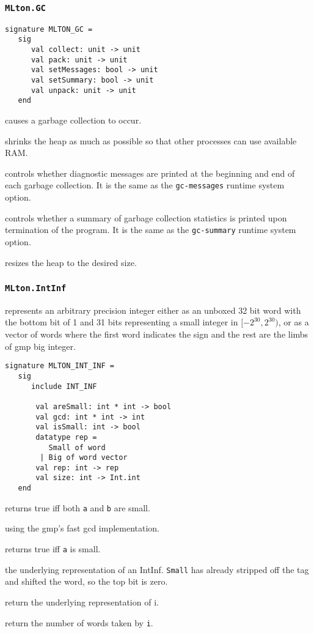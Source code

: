 \subsubsection{{\tt MLton.GC}}
\begin{verbatim}
signature MLTON_GC =
   sig
      val collect: unit -> unit
      val pack: unit -> unit
      val setMessages: bool -> unit
      val setSummary: bool -> unit
      val unpack: unit -> unit
   end
\end{verbatim}

\begin{description}
causes a garbage collection to occur.

shrinks the heap as much as possible so that other processes can use available
RAM.

controls whether diagnostic messages are
printed at the beginning and end of each garbage collection.  It is
the same as the {\tt gc-messages} runtime system option.

controls whether a summary of garbage
collection statistics is printed upon termination of the program.  It
is the same as the {\tt gc-summary} runtime system option.

resizes the heap to the desired size.

\end{description}

\subsubsection{{\tt MLton.IntInf}}

{\mlton} represents an arbitrary precision integer either as an
unboxed 32 bit word with the bottom bit of 1 and 31 bits representing
a small integer in $[-2^{30}, 2^{30})$, or as a vector of words where
the first word indicates the sign and the rest are the limbs of gmp
big integer.
\begin{verbatim}
signature MLTON_INT_INF =
   sig
      include INT_INF

       val areSmall: int * int -> bool
       val gcd: int * int -> int 
       val isSmall: int -> bool
       datatype rep =
          Small of word
        | Big of word vector
       val rep: int -> rep
       val size: int -> Int.int
   end
\end{verbatim}

\begin{description}
returns true iff both {\tt a} and {\tt b} are small.

using the gmp's fast gcd implementation.

returns true iff {\tt a} is small.

the underlying representation of an IntInf.  {\tt Small} has already
stripped off the tag and shifted the word, so the top bit is zero.

return the underlying representation of i.

return the number of words taken by {\tt i}.

\end{description}

